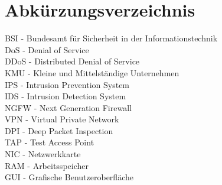 \documentclass[12pt]{scrreprt}
\begin{document}
	
		
		
	\thispagestyle{empty}
	
	\tableofcontents
	\newpage
	
	\setcounter{page}{1}
	
	

	
	
	
    
    
    
    
	\newpage
	
	
	\chapter{Abkürzungsverzeichnis}
	BSI - Bundesamt für Sicherheit in der Informationstechnik \\
	DoS - Denial of Service \\
	DDoS - Distributed Denial of Service\\
	KMU - Kleine und Mittelständige Unternehmen\\
	IPS - Intrusion Prevention System\\
	IDS - Intrusion Detection System\\
	NGFW - Next Generation Firewall\\
	VPN - Virtual Private Network\\
	DPI - Deep Packet Inspection\\
    TAP - Test Access Point\\
    NIC - Netzwerkkarte\\
    RAM - Arbeitsspeicher\\
    GUI - Grafische Benutzeroberfläche\\
    
\end{document}
